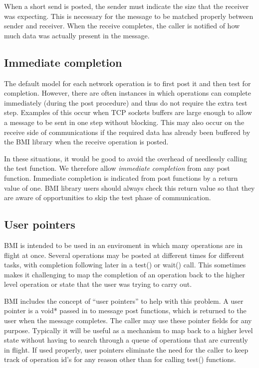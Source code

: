\documentclass[11pt]{article}
\begin{document}
When a short send is posted, the sender must indicate the size
that the receiver was expecting.  This is necessary for the
message to be matched properly between sender and receiver.  When
the receive completes, the caller is notified of how much data was
actually present in the message.

\subsection{Immediate completion}

The default model for each network operation is to first post it and
then test for completion.  However, there are often instances in which
operations can complete immediately (during the post procedure) and thus
do not require the extra test step.  Examples of this occur when TCP
sockets buffers are large enough to allow a message to be sent in one step
without blocking.  This may also occur on the receive side of
communications if the required data has already been buffered by the BMI
library when the receive operation is posted.

In these situations, it would be good to avoid the overhead of
needlessly calling the test function.  We therefore allow
\emph{immediate completion} from any post function.  Immediate
completion is indicated from post functions by a return value of one.
BMI library users should always check this return value so that they are
aware of opportunities to skip the test phase of communication.

\subsection{User pointers}

BMI is intended to be used in an enviroment in which many
operations are in flight at once.  Several
operations may be posted at different times for different tasks,
with completion following later in a test() or wait() call.
This sometimes makes it challenging to map the completion of an
operation back to the higher level operation or state that the
user was trying to carry out.

BMI includes the concept of ``user pointers'' to help with this
problem.  A user pointer is a void* passed in to message post
functions, which is returned to the user when the message
completes.  The caller may use these pointer fields for any
purpose.  Typically it will be useful as a mechanism to map back
to a higher level state without having to search through a queue
of operations that are currently in flight.  If used properly,
user pointers eliminate the need for the caller to keep track of
operation id's for any reason other than for calling test()
functions.
\end{document}
